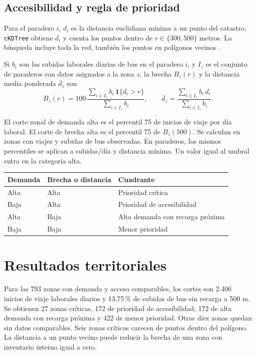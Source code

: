 \documentclass[11pt,a4paper]{article}
\begin{document}
\subsection{Accesibilidad y regla de prioridad}

Para el paradero $i$, $d_i$ es la distancia euclidiana mínima a un punto del catastro. \texttt{cKDTree} obtiene $d_i$ y cuenta los puntos dentro de $r\in\{300,500\}$ metros. La búsqueda incluye toda la red, también los puntos en polígonos vecinos \cite{kdtree}.

Si $b_i$ son las subidas laborales diarias de bus en el paradero $i$, y $I_z$ es el conjunto de paraderos con datos asignados a la zona $z$, la brecha $B_z(r)$ y la distancia media ponderada $\bar d_z$ son
\begin{equation*}
 B_z(r)=100\,\frac{\sum_{i\in I_z} b_i\,\mathbf{1}\{d_i>r\}}{\sum_{i\in I_z} b_i},
 \qquad
 \bar d_z=\frac{\sum_{i\in I_z} b_i\,d_i}{\sum_{i\in I_z} b_i}.
\end{equation*}

El corte zonal de demanda alta es el percentil 75 de inicios de viaje por día laboral. El corte de brecha alta es el percentil 75 de $B_z(500)$. Se calculan en zonas con viajes y subidas de bus observadas. En paraderos, los mismos percentiles se aplican a subidas/día y distancia mínima. Un valor igual al umbral entra en la categoría alta.

\begin{tabularx}{\linewidth}{@{}l l X@{}}
\toprule
\textbf{Demanda} & \textbf{Brecha o distancia} & \textbf{Cuadrante} \\
\midrule
Alta & Alta & Prioridad crítica \\
Baja & Alta & Prioridad de accesibilidad \\
Alta & Baja & Alta demanda con recarga próxima \\
Baja & Baja & Menor prioridad \\
\bottomrule
\end{tabularx}

\clearpage
\section{Resultados territoriales}

Para las 793 zonas con demanda y acceso comparables, los cortes son 2.406 inicios de viaje laborales diarios y 13,75\,\% de subidas de bus sin recarga a 500 m. Se obtienen 27 zonas críticas, 172 de prioridad de accesibilidad, 172 de alta demanda con recarga próxima y 422 de menor prioridad. Otras diez zonas quedan sin datos comparables. Seis zonas críticas carecen de puntos dentro del polígono. La distancia a un punto vecino puede reducir la brecha de una zona con inventario interno igual a cero.
\end{document}
